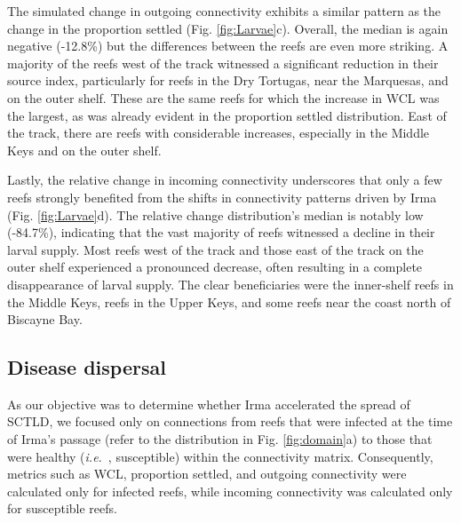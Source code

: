 \documentclass[fleqn,10pt]{wlscirep}
\newcommand{\dobby}[1]{\emph{\textcolor{blue}{#1}}}
\newcommand{\ie}{{\it i.e.}\ }
\begin{document}

The simulated change in outgoing connectivity exhibits a similar pattern as the change in the proportion settled (Fig. \ref{fig:Larvae}c). Overall, the median is again negative (-12.8\%) but the differences between the reefs are even more striking. A majority of the reefs west of the track witnessed a significant reduction in their source index, particularly for reefs in the Dry Tortugas, near the Marquesas, and on the outer shelf. These are the same reefs for which the increase in WCL was the largest, as was already evident in the proportion settled distribution. East of the track, there are reefs with considerable increases, especially in the Middle Keys and on the outer shelf.

Lastly, the relative change in incoming connectivity underscores that only a few reefs strongly benefited from the shifts in connectivity patterns driven by Irma (Fig. \ref{fig:Larvae}d). The relative change distribution's median is notably low (-84.7\%), indicating that the vast majority of reefs witnessed a decline in their larval supply. Most reefs west of the track and those east of the track on the outer shelf experienced a pronounced decrease, often resulting in a complete disappearance of larval supply. The clear beneficiaries were the inner-shelf reefs in the Middle Keys, reefs in the Upper Keys, and some reefs near the coast north of Biscayne Bay.

\subsection{Disease dispersal}
As our objective was to determine whether Irma accelerated the spread of SCTLD, we focused only on connections from reefs that were infected at the time of Irma's passage (refer to the distribution in Fig. \ref{fig:domain}a) to those that were healthy (\ie, susceptible) within the connectivity matrix. Consequently, metrics such as WCL, proportion settled, and outgoing connectivity were calculated only for infected reefs, while incoming connectivity was calculated only for susceptible reefs.
\end{document}
